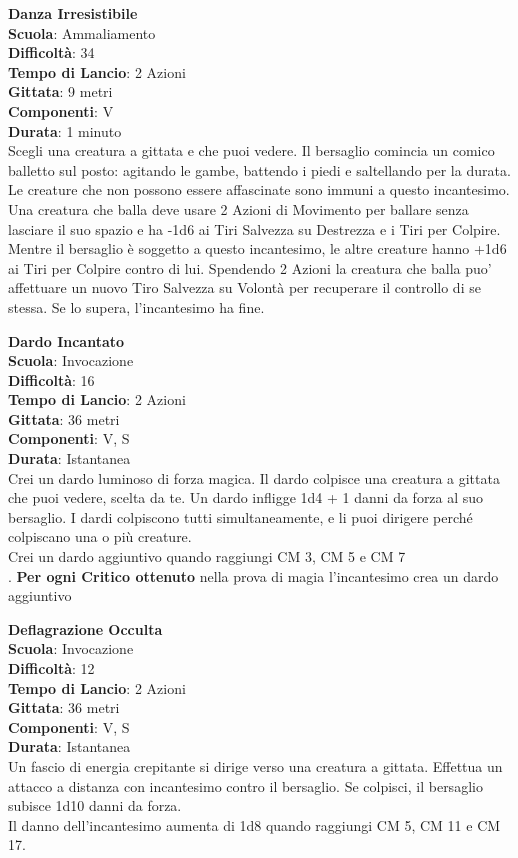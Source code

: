 \begin{multicols}{2}
\medskip\textbf{Danza Irresistibile}\\
\textbf{Scuola}: Ammaliamento\\
\textbf{Difficoltà}: 34\\
\textbf{Tempo di Lancio}: 2 Azioni\\
\textbf{Gittata}: 9 metri\\
\textbf{Componenti}: V\\
\textbf{Durata}: 1 minuto\\
Scegli una creatura a gittata e che puoi vedere. Il bersaglio comincia un comico balletto sul posto: agitando le gambe, battendo i piedi e saltellando per la durata. Le creature che non possono essere affascinate sono immuni a questo incantesimo.\\
Una creatura che balla deve usare 2 Azioni di Movimento per ballare senza lasciare il suo spazio e ha -1d6 ai Tiri Salvezza su Destrezza e i Tiri per Colpire. Mentre il bersaglio è soggetto a questo incantesimo, le altre creature hanno +1d6 ai Tiri per Colpire contro di lui. Spendendo 2 Azioni la creatura che balla puo' affettuare un nuovo Tiro Salvezza su Volontà per recuperare il controllo di se stessa. Se lo supera, l'incantesimo ha fine.

\medskip\textbf{Dardo Incantato}\\
\textbf{Scuola}: Invocazione\\
\textbf{Difficoltà}: 16\\
\textbf{Tempo di Lancio}: 2 Azioni\\
\textbf{Gittata}: 36 metri\\
\textbf{Componenti}: V, S\\
\textbf{Durata}: Istantanea\\
Crei un dardo luminoso di forza magica. Il dardo colpisce una creatura a gittata che puoi vedere, scelta da te. Un dardo infligge 1d4 + 1 danni da forza al suo bersaglio. I dardi colpiscono tutti simultaneamente, e li puoi dirigere perché colpiscano una o più creature.\\
Crei un dardo aggiuntivo quando raggiungi CM 3, CM 5 e CM 7\\.
\textbf{Per ogni Critico ottenuto} nella prova di magia l'incantesimo crea un dardo aggiuntivo

\medskip\textbf{Deflagrazione Occulta}\\
\textbf{Scuola}: Invocazione\\
\textbf{Difficoltà}: 12\\
\textbf{Tempo di Lancio}: 2 Azioni\\
\textbf{Gittata}: 36 metri\\
\textbf{Componenti}: V, S\\
\textbf{Durata}: Istantanea\\
Un fascio di energia crepitante si dirige verso una creatura a gittata. Effettua un attacco a distanza con incantesimo contro il bersaglio. Se colpisci, il bersaglio subisce 1d10 danni da forza.\\
Il danno dell'incantesimo aumenta di 1d8 quando raggiungi CM 5, CM 11 e CM 17.


\end{multicols}

